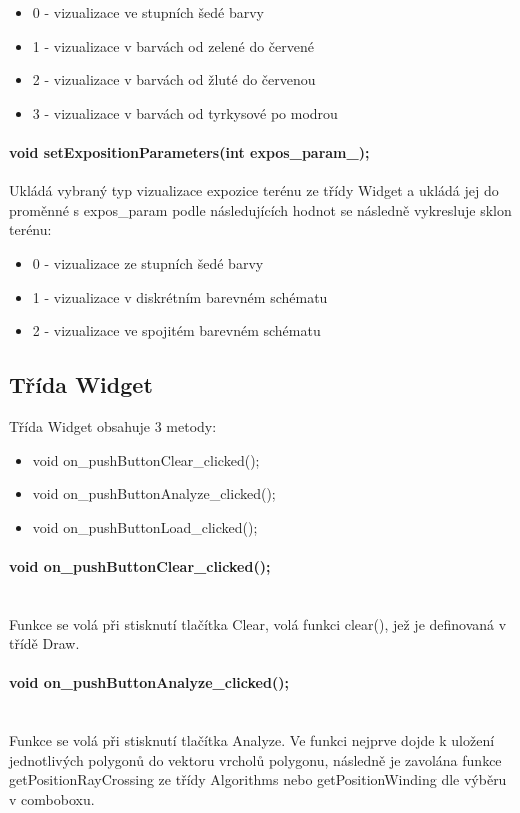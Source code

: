 \documentclass[11pt]{article}
\begin{document}
\begin {itemize}
	\item 0 - vizualizace ve stupních šedé barvy
	\item 1 - vizualizace v barvách od zelené do červené
	\item 2 - vizualizace v barvách od žluté do červenou
	\item 3 - vizualizace v barvách od tyrkysové po modrou
\end {itemize}
  
\paragraph {void setExpositionParameters(int expos\_param\_);}
Ukládá vybraný typ vizualizace expozice terénu ze třídy Widget a ukládá jej do proměnné s expos\_param podle následujících hodnot se následně vykresluje sklon terénu: 

\begin{itemize}
	\item 0 - vizualizace ze stupních šedé barvy
	\item 1 - vizualizace v diskrétním barevném schématu
	\item 2 - vizualizace ve spojitém barevném schématu
\end{itemize}

\subsection{Třída Widget}
Třída Widget obsahuje 3 metody:

\begin{itemize}
\item void on\_pushButtonClear\_clicked();
\item void on\_pushButtonAnalyze\_clicked();
\item void on\_pushButtonLoad\_clicked();
\end{itemize}

\paragraph{ void on\_pushButtonClear\_clicked();}\mbox{}\\
Funkce se volá při stisknutí tlačítka Clear, volá funkci clear(), jež je definovaná v třídě Draw.

\paragraph{ void on\_pushButtonAnalyze\_clicked();}\mbox{}\\
Funkce se volá při stisknutí tlačítka Analyze. Ve funkci nejprve dojde k uložení jednotlivých polygonů do vektoru vrcholů polygonu, následně je zavolána funkce getPositionRayCrossing ze třídy Algorithms nebo getPositionWinding dle výběru v comboboxu.
\end{document}
